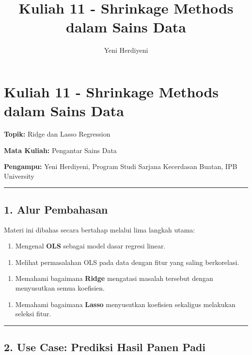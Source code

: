 \documentclass[12pt,a4paper]{article}
\title{Kuliah 11 - Shrinkage Methods dalam Sains Data}
\author{Yeni Herdiyeni}
\date{}
\begin{document}
\maketitle
\tableofcontents
\newpage

\section{Kuliah 11 - Shrinkage Methods dalam Sains Data}

\textbf{Topik:} Ridge dan Lasso Regression  

\textbf{Mata Kuliah:} Pengantar Sains Data  

\textbf{Pengampu:} Yeni Herdiyeni, Program Studi Sarjana Kecerdasan Buatan, IPB University


\hrule


\subsection{1. Alur Pembahasan}

Materi ini dibahas secara bertahap melalui lima langkah utama:


\begin{enumerate}
\item Mengenal \textbf{OLS} sebagai model dasar regresi linear.
\end{enumerate}

\begin{enumerate}
\item Melihat permasalahan OLS pada data dengan fitur yang saling berkorelasi.
\end{enumerate}

\begin{enumerate}
\item Memahami bagaimana \textbf{Ridge} mengatasi masalah tersebut dengan menyusutkan semua koefisien.
\end{enumerate}

\begin{enumerate}
\item Memahami bagaimana \textbf{Lasso} menyusutkan koefisien sekaligus melakukan seleksi fitur.
\end{enumerate}


\hrule


\subsection{2. Use Case: Prediksi Hasil Panen Padi}
\end{document}
